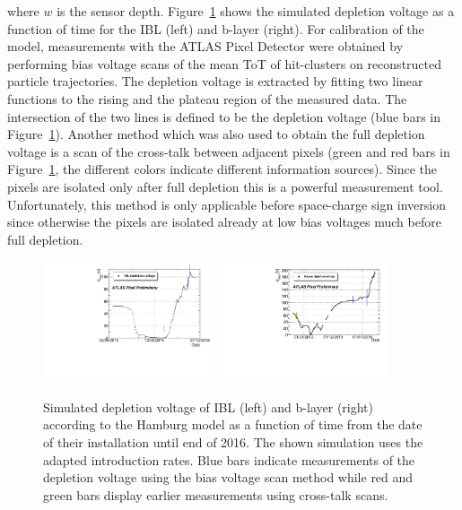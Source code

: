 where $w$ is the sensor depth. Figure~\ref{fig:electricfield:depletionvoltage} shows the simulated depletion voltage as a function of time for the IBL
 (left) and b-layer (right). For calibration of the model, measurements with the ATLAS Pixel Detector were obtained by performing bias voltage scans of the mean ToT of hit-clusters on reconstructed particle trajectories. The depletion voltage is extracted by fitting two linear functions to the rising and the plateau region of the measured data. The intersection of the two lines is defined to be the depletion voltage (blue bars in Figure~\ref{fig:electricfield:depletionvoltage}). Another method which was also used to obtain the full depletion voltage is a scan of the cross-talk between adjacent pixels (green and red bars in Figure~\ref{fig:electricfield:depletionvoltage}, the different colors indicate different information sources). Since the pixels are isolated only after full depletion this is a powerful measurement tool. Unfortunately, this method is only applicable before space-charge sign inversion since otherwise the pixels are isolated already at low bias voltages much before full depletion.

\begin{figure}[!htpb]
\centering
\includegraphics[width=0.45\textwidth]{IBL_2016_new.pdf}
\includegraphics[width=0.45\textwidth]{BLayer_2016_new.pdf}
\caption{Simulated depletion voltage of IBL (left) and b-layer (right) according to the Hamburg model as a function of time from the date of their installation until end of 2016. The shown simulation uses the adapted introduction rates. Blue bars indicate measurements of the depletion voltage using the bias voltage scan method while red and green bars display earlier measurements using cross-talk scans.}
\label{fig:electricfield:depletionvoltage}
\end{figure}

